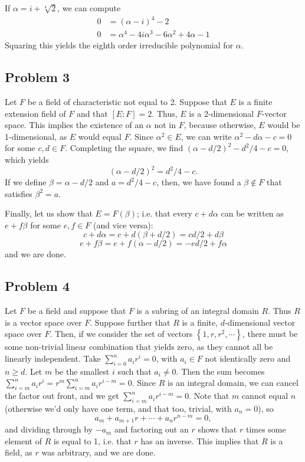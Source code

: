 \documentclass{../../mathnotes}
\begin{document}
If $\alpha=i+\sqrt[4]{2}$, we can compute 
\begin{align*}
    0&=(\alpha-i)^4-2\\
    0&=\alpha^4-4i\alpha^3-6\alpha^2+4\alpha-1
\end{align*}
Squaring this yields the eighth order irreducible polynomial for $\alpha$.


\subsection*{Problem 3}

Let $F$ be a field of characteristic not equal to 2. Suppose that $E$ is a finite extension field of $F$ and that $[E:F]=2$.
Thus, $E$ is a 2-dimensional $F$-vector space. This implies the existence of an $\alpha$ not in $F$, because otherwise, $E$ would
be 1-dimensional, as $E$ would equal $F$. Since $\alpha^2\in E$, we can write $\alpha^2-d\alpha-c=0$ for some $c,d\in F$.
Completing the square, we find $(\alpha-d/2)^2-d^2/4-c=0$, which yields
\[(\alpha-d/2)^2=d^2/4-c.\]
If we define $\beta=\alpha-d/2$ and $a=d^2/4-c$, then, we have found a $\beta\notin F$ that satisfies $\beta^2=a$.

Finally, let us show that $E=F(\beta)$; i.e. that every $c+d\alpha$ can be written as $e+f\beta$ for some $e,f\in F$
(and vice versa):
\[c+d\alpha=c+d(\beta+d/2)=cd/2+d\beta\]
\[e+f\beta=e+f(\alpha-d/2)=-ed/2+f\alpha\]
and we are done.

\subsection*{Problem 4}

Let $F$ be a field and suppose that $F$ is a subring of an integral domain $R$. Thus $R$ is a vector space over $F$.
Suppose further that $R$ is a finite, $d$-dimensional vector space over $F$. Then, if we consider the set of vectors
$\left\{ 1,r,r^2,\cdots \right\}$, there must be some non-trivial linear combination that yields zero, as they
cannot all be linearly independent. Take $\sum_{i=0}^na_ir^i=0$, with $a_i\in F$ not identically zero and $n\geq d$.
Let $m$ be the smallest $i$ such that $a_i\neq 0$. Then the sum becomes
$\sum_{i=m}^na_ir^i=r^m\sum_{i=m}^na_ir^{i-m}=0$. Since $R$ is an integral domain, we can cancel the factor out front,
and we get $\sum_{i=m}^na_ir^{i-m}=0$. Note that $m$ cannot equal $n$ (otherwise we'd only have one term, and that too,
trivial, with $a_n=0$), so
\[a_m+a_{m+1}r+\cdots+a_nr^{n-m}=0,\]
and dividing through by $-a_m$ and factoring out an $r$ shows that $r$ times some element of $R$ is equal to 1, i.e.
that $r$ has an inverse. This implies that $R$ is a field, as $r$ was arbitrary, and we are done.
\end{document}
